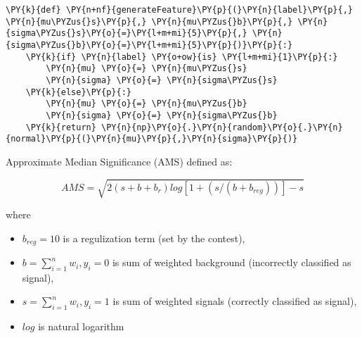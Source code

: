 {\par%
\vspace{-1\baselineskip}%
}%
\begin{notebookcell}[]%
\begin{addmargin}[\cellleftmargin]{0em}%
{\smaller%
\par%
%
\vspace{-1\smallerfontscale}%
\begin{Verbatim}[commandchars=\\\{\}]
\PY{k}{def} \PY{n+nf}{generateFeature}\PY{p}{(}\PY{n}{label}\PY{p}{,} \PY{n}{mu\PYZus{}s}\PY{p}{,} \PY{n}{mu\PYZus{}b}\PY{p}{,} \PY{n}{sigma\PYZus{}s}\PY{o}{=}\PY{l+m+mi}{5}\PY{p}{,} \PY{n}{sigma\PYZus{}b}\PY{o}{=}\PY{l+m+mi}{5}\PY{p}{)}\PY{p}{:}
    \PY{k}{if} \PY{n}{label} \PY{o+ow}{is} \PY{l+m+mi}{1}\PY{p}{:}
        \PY{n}{mu} \PY{o}{=} \PY{n}{mu\PYZus{}s}
        \PY{n}{sigma} \PY{o}{=} \PY{n}{sigma\PYZus{}s}
    \PY{k}{else}\PY{p}{:}
        \PY{n}{mu} \PY{o}{=} \PY{n}{mu\PYZus{}b}
        \PY{n}{sigma} \PY{o}{=} \PY{n}{sigma\PYZus{}b}
    \PY{k}{return} \PY{n}{np}\PY{o}{.}\PY{n}{random}\PY{o}{.}\PY{n}{normal}\PY{p}{(}\PY{n}{mu}\PY{p}{,}\PY{n}{sigma}\PY{p}{)}
\end{Verbatim}
%
\par%
\vspace{-1\smallerfontscale}}%
\end{addmargin}
\end{notebookcell}


    Approximate Median Significance (AMS) defined as:

\[AMS = \sqrt{2 { (s + b + b_r) log[1 + (s/(b+b_{reg}))] - s}}\]

where

\begin{itemize}
\tightlist
\item
  \(b_{reg} = 10\) is a regulization term (set by the contest),
\item
  \(b = \sum_{i=1}^{n} w_i, y_i=0\) is sum of weighted background
  (incorrectly classified as signal),
\item
  \(s = \sum_{i=1}^{n} w_i, y_i=1\) is sum of weighted signals
  (correctly classified as signal),
\item
  \(log\) is natural logarithm
\end{itemize}


